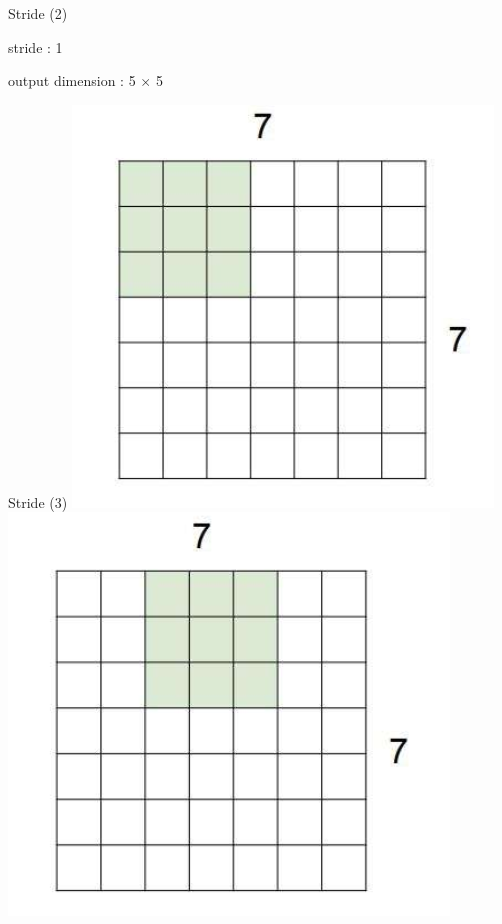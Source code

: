\documentclass[serif, aspectratio=169]{beamer}
\begin{document}
\begin{frame}{Stride (2)}
		\smallskip	
		\begin{itemsize}
			\item stride : 1
			\item output dimension : 5 $\times$ 5
		\end{itemsize}
	\end{frame}
	\begin{frame}{Stride (3)}
		\includegraphics[keepaspectratio, scale=0.5]{pic/stride21.png}
		\includegraphics[keepaspectratio, scale=0.5]{pic/stride22.png}

\end{frame}
\end{document}
